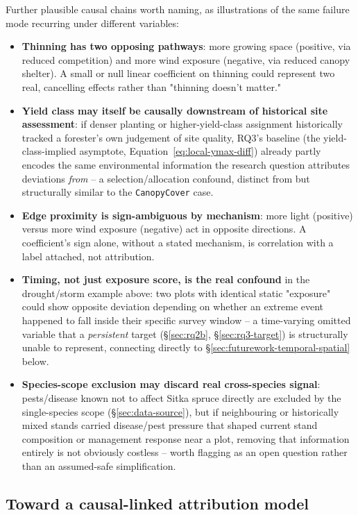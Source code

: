 Further plausible causal chains worth naming, as illustrations of the same failure mode recurring
under different variables:
\begin{itemize}
\item \textbf{Thinning has two opposing pathways}: more growing space (positive, via reduced
  competition) and more wind exposure (negative, via reduced canopy shelter). A small or null
  linear coefficient on thinning could represent two real, cancelling effects rather than "thinning
  doesn't matter."
\item \textbf{Yield class may itself be causally downstream of historical site assessment}: if
  denser planting or higher-yield-class assignment historically tracked a forester's own judgement
  of site quality, RQ3's baseline (the yield-class-implied asymptote,
  Equation~\ref{eq:local-ymax-diff}) already partly encodes the same environmental information the
  research question attributes deviations \emph{from} -- a selection/allocation confound, distinct
  from but structurally similar to the \texttt{CanopyCover} case.
\item \textbf{Edge proximity is sign-ambiguous by mechanism}: more light (positive) versus more
  wind exposure (negative) act in opposite directions. A coefficient's sign alone, without a stated
  mechanism, is correlation with a label attached, not attribution.
\item \textbf{Timing, not just exposure score, is the real confound} in the drought/storm example
  above: two plots with identical static "exposure" could show opposite deviation depending on
  whether an extreme event happened to fall inside their specific survey window -- a time-varying
  omitted variable that a \emph{persistent} target (\S\ref{sec:rq2b}, \S\ref{sec:rq3-target}) is
  structurally unable to represent, connecting directly to
  \S\ref{sec:futurework-temporal-spatial} below.
\item \textbf{Species-scope exclusion may discard real cross-species signal}: pests/disease known
  not to affect Sitka spruce directly are excluded by the single-species scope
  (\S\ref{sec:data-source}), but if neighbouring or historically mixed stands carried
  disease/pest pressure that shaped current stand composition or management response near a plot,
  removing that information entirely is not obviously costless -- worth flagging as an open
  question rather than an assumed-safe simplification.
\end{itemize}

\subsection{Toward a causal-linked attribution model}
\label{sec:futurework-causal-model}

